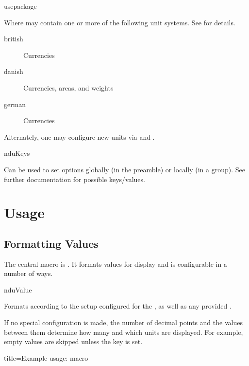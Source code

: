 \documentclass[
	a4paper,
]{article}
\begin{document}
\begin{docCommand}
	{usepackage}
	{}

Where  may contain one or more of the following unit systems. See  for details.

\begin{description}
\item[british] Currencies
\item[danish] Currencies, areas, and weights
\item[german] Currencies
\end{description}

Alternately, one may configure new units via  and .

\end{docCommand}

\begin{docCommand}
	{nduKeys}
	{}

	Can be used to set options globally (in the preamble) or locally (in a group). See further documentation for possible keys/values.

\end{docCommand}

\clearpage
\section{Usage} %

\subsection{Formatting Values} %

The central macro is . It formats values for display and is configurable in a number of ways.

\begin{docCommand}
	{nduValue}
	{}

Formats  according to the setup configured for the , as well as any provided .

If no special configuration is made, the number of decimal points and the values between them determine how many and which units are displayed. For example, empty values are skipped unless the  key is set.
	
\begin{dispExample*}{
	title=Example usage:  macro
}
\\
\\
\\
\\
\end{dispExample*}
\end{docCommand}
\end{document}
